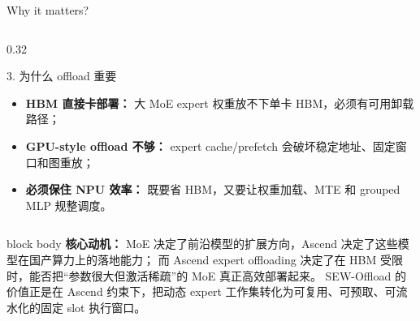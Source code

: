 \documentclass[aspectratio=169,10pt]{beamer}
\begin{document}
\begin{frame}[t]{Why it matters?}
\begin{columns}[T,onlytextwidth]
\begin{column}{0.32\textwidth}
\begin{minipage}[t][0.34\textheight][t]{\linewidth}
\begin{block}{3. 为什么 offload 重要}
\scriptsize
\begin{itemize}
  \item \textbf{HBM 直接卡部署：} 大 MoE expert 权重放不下单卡 HBM，必须有可用卸载路径；
  \item \textbf{GPU-style offload 不够：} expert cache/prefetch 会破坏稳定地址、固定窗口和图重放；
  \item \textbf{必须保住 NPU 效率：} 既要省 HBM，又要让权重加载、MTE 和 grouped MLP 规整调度。
\end{itemize}
\end{block}
\end{minipage}
\end{column}
\end{columns}

\vspace{5.5em}
\begin{beamercolorbox}[wd=\linewidth,sep=0.55em,rounded=true]{block body}
\scriptsize
\textbf{\textcolor{AccentRed}{核心动机：}}
MoE 决定了前沿模型的扩展方向，Ascend 决定了这些模型在国产算力上的落地能力；
而 Ascend expert offloading 决定了在 HBM 受限时，能否把“参数很大但激活稀疏”的 MoE 真正高效部署起来。
SEW-Offload 的价值正是在 Ascend 约束下，把动态 expert 工作集转化为可复用、可预取、可流水化的固定 slot 执行窗口。
\end{beamercolorbox}
\end{frame}
\end{document}
